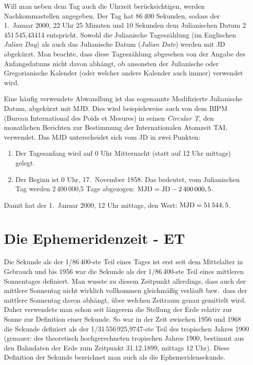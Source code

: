 Will man neben dem Tag auch die Uhrzeit ber\"ucksichtigen, werden Nachkommastellen angegeben.
Der Tag hat 86\,400 Sekunden, sodass der 1.\ Januar 2000, 22 Uhr 25 Minuten und 10 Sekunden dem
Julianischen Datum 2\,451\,545,43414 entspricht. Sowohl die Julianische Tagesz\"ahlung (im Englischen
\textit{Julian Day}) als auch das  
Julianische Datum (\textit{Julian Date}) werden mit JD abgek\"urzt. 
Man beachte, dass diese Tagesz\"ahlung abgesehen von der Angabe des Anfangsdatums
nicht davon abh\"angt, ob ansonsten der Julianische oder Gregorianische Kalender (oder welcher andere 
Kalender auch immer) verwendet wird. 

Eine h\"aufig verwendete Abwandlung ist das sogenannte 
Modifizierte Julianische Datum, abgek\"urzt mit
MJD. Dies wird beispielsweise auch von dem BIPM (Bureau International des Poids et Mesures) in seinen
\textit{Circular T}, 
den monatlichen Berichten zur Bestimmung der Internationalen Atomzeit TAI,
verwendet. Das MJD unterscheidet sich vom JD in zwei Punkten:
\begin{enumerate}
\item
Der Tagesanfang wird auf 0 Uhr Mitternacht (statt auf 12 Uhr mittags) gelegt.
\item  
Der Beginn ist 0 Uhr, 17.\ November 1858. Das bedeutet, vom Julianischen Tag werden 2\,400\,000,5 Tage
abgezogen: ${\rm MJD=JD}-2\,400\,000,5$.       
\end{enumerate}
Damit hat der 1.\ Januar 2000, 12 Uhr mittags, den Wert: ${\rm MJD}= 51\,544,5$.  

\section{Die Ephemeridenzeit - ET}

Die 
Sekunde als der 1/86\,400-ste Teil eines Tages ist erst seit dem Mittelalter in Gebrauch
und bis 1956 war die Sekunde als der 1/86\,400-ste Teil eines mittleren Sonnentages definiert. 
Man wusste zu diesem Zeitpunkt allerdings, dass auch der mittlere Sonnentag nicht wirklich
vollkommen gleichm\"a\ss ig verl\"auft bzw.\ dass der mittlere Sonnentag davon abh\"angt, \"uber
welchen Zeitraum genau gemittelt wird. Daher verwendete man schon seit l\"angerem die Stellung
der Erde relativ zur Sonne zur Definition einer Sekunde. So war in der Zeit zwischen 1956 und 1968
die Sekunde definiert als der 1/31\,556\,925,9747-ste Teil des tropischen Jahres 1900 
(genauer: des theoretisch hochgerechneten tropischen
Jahres 1900, bestimmt aus den Bahndaten der Erde zum Zeitpunkt 31.12.1899, mittags 12 Uhr).
Diese Definition der Sekunde bezeichnet man auch als die 
Ephemeridensekunde.

